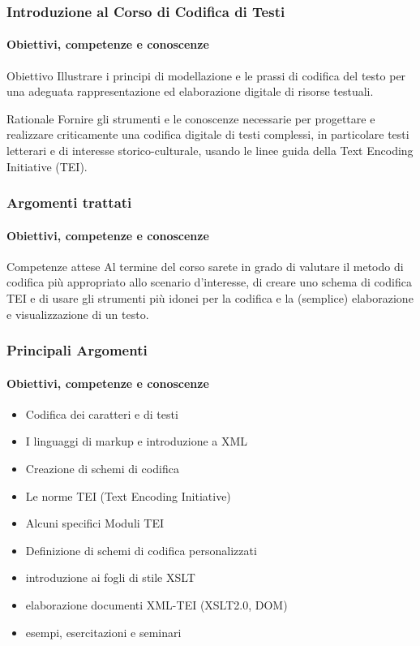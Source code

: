 
\begin{frame}
    \frametitle{Introduzione al Corso di Codifica di Testi}
    \framesubtitle{Obiettivi, competenze e conoscenze}
    \addtocounter{nframe}{1}
    
    \begin{block}{Obiettivo}
        Illustrare i principi di modellazione e le prassi di codifica del testo per una adeguata rappresentazione ed elaborazione digitale di risorse testuali.  
    \end{block}

    \begin{block}{Rationale}
       Fornire gli strumenti e le conoscenze necessarie per progettare e realizzare criticamente una codifica digitale di testi complessi, in particolare testi letterari e di interesse storico-culturale, usando le linee guida della Text Encoding Initiative (TEI).
    \end{block}

\end{frame}

\begin{frame}
    \frametitle{Argomenti trattati}
    \framesubtitle{Obiettivi, competenze e conoscenze}
    \addtocounter{nframe}{1}
    
    \begin{block}{Competenze attese}
        Al termine del corso sarete in grado di valutare il metodo di codifica più appropriato allo scenario d'interesse, di creare uno schema di codifica TEI e di usare gli strumenti più idonei per la codifica e la (semplice) elaborazione e visualizzazione di un testo.
    \end{block}

\end{frame}

\begin{frame}
    \frametitle{Principali Argomenti}
    \framesubtitle{Obiettivi, competenze e conoscenze}
    \addtocounter{nframe}{1}

    
        \begin{itemize}
            \item Codifica dei caratteri e di testi
            \item I linguaggi di markup e introduzione a XML
            \item Creazione di schemi di codifica
            \item Le norme TEI (Text Encoding Initiative)
            \item Alcuni specifici Moduli TEI
            \item Definizione di schemi di codifica personalizzati
            \item introduzione ai fogli di stile XSLT
            \item elaborazione documenti XML-TEI (XSLT2.0, DOM)
            \item esempi, esercitazioni e seminari 
        \end{itemize}

\end{frame}


